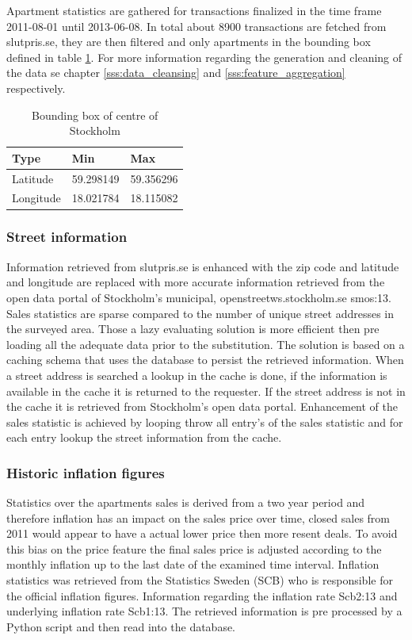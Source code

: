 Apartment statistics are gathered for transactions finalized in the time frame 2011-08-01 until 2013-06-08. In total about 8900 transactions are fetched from slutpris.se, they are then filtered and only apartments in the bounding box defined in table \ref{tab:sthlm_bounding_geobox}. For more information regarding the generation and cleaning of the data se chapter \ref{sss:data_cleansing} and \ref{sss:feature_aggregation} respectively.

\begin{table}[H]
\begin{tabular}{ | l | l | l | } 
\hline 
Type & Min & Max \\
\hline
Latitude & 59.298149 & 59.356296 \\
Longitude & 18.021784 & 18.115082 \\
\hline
\end{tabular}
\caption{Bounding box of centre of Stockholm}
\label{tab:sthlm_bounding_geobox}
\end{table}


\subsubsection{Street information} \label{sss:street_info}
Information retrieved from slutpris.se is enhanced with the zip code and latitude and longitude are replaced with more accurate information retrieved from the open data portal of Stockholm's municipal, openstreetws.stockholm.se \cite{dat}{smos:13}. Sales statistics are sparse compared to the number of unique street addresses in the surveyed area. Those a lazy evaluating solution is more efficient then pre loading all the adequate data prior to the substitution. The solution is based on a caching schema that uses the database to persist the retrieved information. When a street address is searched a lookup in the cache is done, if the information is available in the cache it is returned to the requester. If the street address is not in the cache it is retrieved from Stockholm's open data portal.  Enhancement of the sales statistic is achieved by looping throw all entry's of the sales statistic and for each entry lookup the street information from the cache. 

\subsubsection{Historic inflation figures} \label{sss:hist_inflation}
Statistics over the apartments sales is derived from a two year period and therefore inflation has an impact on the sales price over time, closed sales from 2011 would appear to have a actual lower price then more resent deals. To avoid this bias on the price feature the final sales price is adjusted according to the monthly inflation up to the last date of the examined time interval. Inflation statistics was retrieved from the Statistics Sweden (SCB) who is responsible for the official inflation figures. Information regarding the inflation rate \cite{dat}{Scb2:13} and underlying inflation rate \cite{dat}{Scb1:13}. The retrieved information is pre processed by a Python script and then read into the database.  

